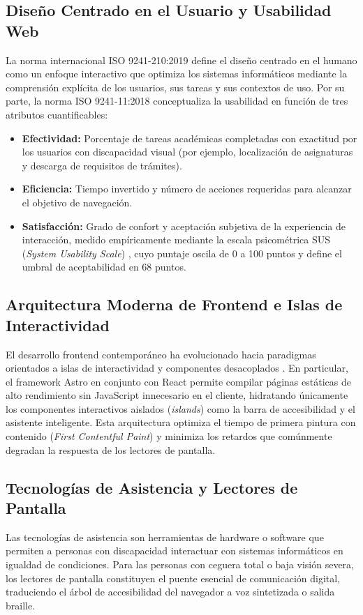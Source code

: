 \subsection{Diseño Centrado en el Usuario y Usabilidad Web}
La norma internacional ISO 9241-210:2019 \cite{iso9241_210_2019} define el diseño centrado en el humano como un enfoque interactivo que optimiza los sistemas informáticos mediante la comprensión explícita de los usuarios, sus tareas y sus contextos de uso. Por su parte, la norma ISO 9241-11:2018 \cite{iso9241_11_2018} conceptualiza la usabilidad en función de tres atributos cuantificables:
\begin{itemize}
  \item \textbf{Efectividad:} Porcentaje de tareas académicas completadas con exactitud por los usuarios con discapacidad visual (por ejemplo, localización de asignaturas y descarga de requisitos de trámites).
  \item \textbf{Eficiencia:} Tiempo invertido y número de acciones requeridas para alcanzar el objetivo de navegación.
  \item \textbf{Satisfacción:} Grado de confort y aceptación subjetiva de la experiencia de interacción, medido empíricamente mediante la escala psicométrica SUS (\textit{System Usability Scale}) \cite{brooke1996sus}, cuyo puntaje oscila de 0 a 100 puntos y define el umbral de aceptabilidad en 68 puntos.
\end{itemize}

\subsection{Arquitectura Moderna de Frontend e Islas de Interactividad}
El desarrollo frontend contemporáneo ha evolucionado hacia paradigmas orientados a islas de interactividad y componentes desacoplados \cite{peltonen2021microfrontends,richards2020fundamentals}. En particular, el framework Astro en conjunto con React permite compilar páginas estáticas de alto rendimiento sin JavaScript innecesario en el cliente, hidratando únicamente los componentes interactivos aislados (\textit{islands}) como la barra de accesibilidad y el asistente inteligente. Esta arquitectura optimiza el tiempo de primera pintura con contenido (\textit{First Contentful Paint}) y minimiza los retardos que comúnmente degradan la respuesta de los lectores de pantalla.

\subsection{Tecnologías de Asistencia y Lectores de Pantalla}
Las tecnologías de asistencia son herramientas de hardware o software que permiten a personas con discapacidad interactuar con sistemas informáticos en igualdad de condiciones. Para las personas con ceguera total o baja visión severa, los lectores de pantalla constituyen el puente esencial de comunicación digital, traduciendo el árbol de accesibilidad del navegador a voz sintetizada o salida braille.

